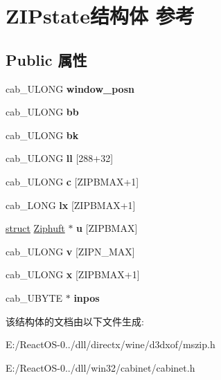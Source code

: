 \hypertarget{struct_z_i_pstate}{}\section{Z\+I\+Pstate结构体 参考}
\label{struct_z_i_pstate}
\subsection*{Public 属性}
\begin{DoxyCompactItemize}
\item 
\mbox{\label{struct_z_i_pstate_acc10acd52397d96a8671eb42a3ad8ff0}} 
cab\+\_\+\+U\+L\+O\+NG {\bfseries window\+\_\+posn}
\item 
\mbox{\label{struct_z_i_pstate_a848c72fda429045b118f17db7d7ec6bf}} 
cab\+\_\+\+U\+L\+O\+NG {\bfseries bb}
\item 
\mbox{\label{struct_z_i_pstate_a486416213d56b8796f3f96be1da919ec}} 
cab\+\_\+\+U\+L\+O\+NG {\bfseries bk}
\item 
\mbox{\label{struct_z_i_pstate_a6bb6bbebc164d7cdd537651882a77ce3}} 
cab\+\_\+\+U\+L\+O\+NG {\bfseries ll} \mbox{[}288+32\mbox{]}
\item 
\mbox{\label{struct_z_i_pstate_a6696c552a1ea8f3a1cae7c0d83a0a9bf}} 
cab\+\_\+\+U\+L\+O\+NG {\bfseries c} \mbox{[}Z\+I\+P\+B\+M\+AX+1\mbox{]}
\item 
\mbox{\label{struct_z_i_pstate_a91fb48579a92db0fb92a7a15fabc584b}} 
cab\+\_\+\+L\+O\+NG {\bfseries lx} \mbox{[}Z\+I\+P\+B\+M\+AX+1\mbox{]}
\item 
\mbox{\label{struct_z_i_pstate_a444553708958d76b3b58b29c54d2fc38}} 
\hyperlink{interfacestruct}{struct} \hyperlink{struct_ziphuft}{Ziphuft} $\ast$ {\bfseries u} \mbox{[}Z\+I\+P\+B\+M\+AX\mbox{]}
\item 
\mbox{\label{struct_z_i_pstate_a1112565ec4f208d6bd14307a01b808df}} 
cab\+\_\+\+U\+L\+O\+NG {\bfseries v} \mbox{[}Z\+I\+P\+N\+\_\+\+M\+AX\mbox{]}
\item 
\mbox{\label{struct_z_i_pstate_affcda356e5e94fd95e7eea5ac3463366}} 
cab\+\_\+\+U\+L\+O\+NG {\bfseries x} \mbox{[}Z\+I\+P\+B\+M\+AX+1\mbox{]}
\item 
\mbox{\label{struct_z_i_pstate_a73013709941c360b10be4a509bdbfa98}} 
cab\+\_\+\+U\+B\+Y\+TE $\ast$ {\bfseries inpos}
\end{DoxyCompactItemize}


该结构体的文档由以下文件生成\+:\begin{DoxyCompactItemize}
\item 
E\+:/\+React\+O\+S-\/0../dll/directx/wine/d3dxof/mszip.\+h\item 
E\+:/\+React\+O\+S-\/0../dll/win32/cabinet/cabinet.\+h\end{DoxyCompactItemize}
